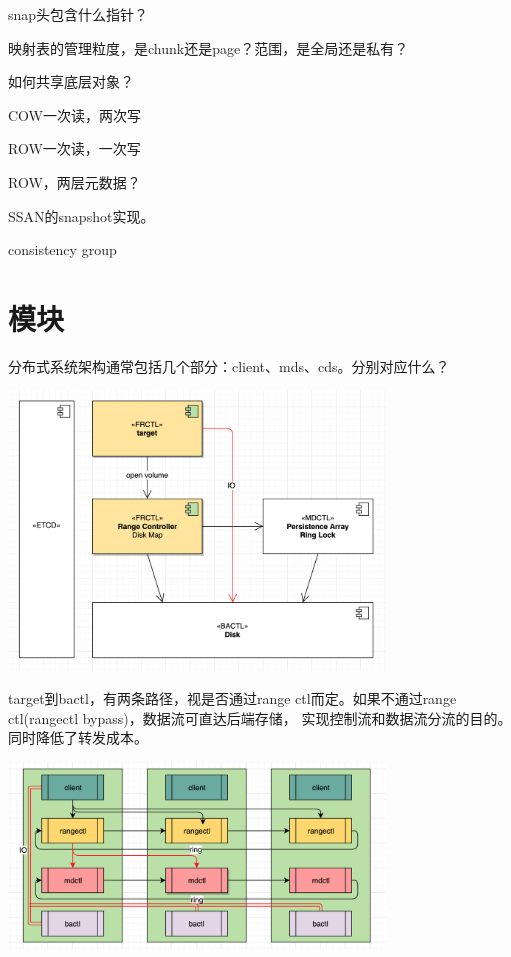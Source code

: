 snap头包含什么指针？

映射表的管理粒度，是chunk还是page？范围，是全局还是私有？

如何共享底层对象？

COW一次读，两次写

ROW一次读，一次写

ROW，两层元数据？

\hrulefill

SSAN的snapshot实现。

consistency group

\section{模块}

分布式系统架构通常包括几个部分：client、mds、cds。分别对应什么？
\begin{center}
\includegraphics[width=10cm]{../imgs/modules.png}
\end{center}

target到bactl，有两条路径，视是否通过range ctl而定。如果不通过range ctl(rangectl bypass)，数据流可直达后端存储，
实现控制流和数据流分流的目的。同时降低了转发成本。

\begin{center}
\includegraphics[width=10cm]{../imgs/message-flow.png}
\end{center}

